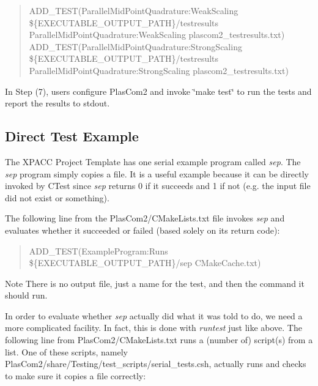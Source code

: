 \begin{quote}
A\+D\+D\+\_\+\+T\+E\+ST(Parallel\+Mid\+Point\+Quadrature\+:Weak\+Scaling \$\{E\+X\+E\+C\+U\+T\+A\+B\+L\+E\+\_\+\+O\+U\+T\+P\+U\+T\+\_\+\+P\+A\+TH\}/testresults Parallel\+Mid\+Point\+Quadrature\+:Weak\+Scaling plascom2\+\_\+testresults.\+txt)~\newline
A\+D\+D\+\_\+\+T\+E\+ST(Parallel\+Mid\+Point\+Quadrature\+:Strong\+Scaling \$\{E\+X\+E\+C\+U\+T\+A\+B\+L\+E\+\_\+\+O\+U\+T\+P\+U\+T\+\_\+\+P\+A\+TH\}/testresults Parallel\+Mid\+Point\+Quadrature\+:Strong\+Scaling plascom2\+\_\+testresults.\+txt)~\newline
\end{quote}


In Step (7), users configure Plas\+Com2 and invoke \char`\"{}make test\char`\"{} to run the tests and report the results to stdout.\hypertarget{testingproject_guide_direct_tests}{}\subsection{Direct Test Example}\label{testingproject_guide_direct_tests}
The X\+P\+A\+CC Project Template has one serial example program called {\itshape sep}. The {\itshape sep} program simply copies a file. It is a useful example because it can be directly invoked by C\+Test since {\itshape sep} returns 0 if it succeeds and 1 if not (e.\+g. the input file did not exist or something).

The following line from the {\ttfamily Plas\+Com2/\+C\+Make\+Lists.\+txt} file invokes {\itshape sep} and evaluates whether it succeeded or failed (based solely on its return code)\+:

\begin{quote}
A\+D\+D\+\_\+\+T\+E\+ST(Example\+Program\+:Runs \$\{E\+X\+E\+C\+U\+T\+A\+B\+L\+E\+\_\+\+O\+U\+T\+P\+U\+T\+\_\+\+P\+A\+TH\}/sep C\+Make\+Cache.\+txt) \end{quote}


\begin{DoxyNote}{Note}
There is no output file, just a name for the test, and then the command it should run.
\end{DoxyNote}
In order to evaluate whether {\itshape sep} actually did what it was told to do, we need a more complicated facility. In fact, this is done with {\itshape runtest} just like above. The following line from {\ttfamily Plas\+Com2/\+C\+Make\+Lists.\+txt} runs a (number of) script(s) from a list. One of these scripts, namely {\ttfamily Plas\+Com2/share/\+Testing/test\+\_\+scripts/serial\+\_\+tests.\+csh}, actually runs  and checks to make sure it copies a file correctly\+:

